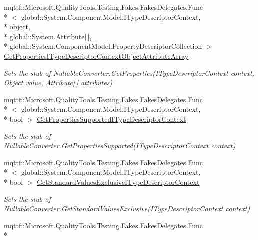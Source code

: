 \begin{DoxyCompactItemize}
mqttf\-::\-Microsoft.\-Quality\-Tools.\-Testing.\-Fakes.\-Fakes\-Delegates.\-Func\\*
$<$ global\-::\-System.\-Component\-Model.\-I\-Type\-Descriptor\-Context, \\*
object, \\*
global\-::\-System.\-Attribute\mbox{[}$\,$\mbox{]}, \\*
global\-::\-System.\-Component\-Model.\-Property\-Descriptor\-Collection $>$ \hyperlink{class_system_1_1_component_model_1_1_fakes_1_1_stub_nullable_converter_a119ee3811381aca5daedfe54266578bd}{Get\-Properties\-I\-Type\-Descriptor\-Context\-Object\-Attribute\-Array}
\begin{DoxyCompactList}\small\item\em Sets the stub of Nullable\-Converter.\-Get\-Properties(\-I\-Type\-Descriptor\-Context context, Object value, Attribute\mbox{[}$\,$\mbox{]} attributes)\end{DoxyCompactList}\item 
mqttf\-::\-Microsoft.\-Quality\-Tools.\-Testing.\-Fakes.\-Fakes\-Delegates.\-Func\\*
$<$ global\-::\-System.\-Component\-Model.\-I\-Type\-Descriptor\-Context, \\*
bool $>$ \hyperlink{class_system_1_1_component_model_1_1_fakes_1_1_stub_nullable_converter_a5f01e07d0064ef551fd367579dabf2e4}{Get\-Properties\-Supported\-I\-Type\-Descriptor\-Context}
\begin{DoxyCompactList}\small\item\em Sets the stub of Nullable\-Converter.\-Get\-Properties\-Supported(\-I\-Type\-Descriptor\-Context context)\end{DoxyCompactList}\item 
mqttf\-::\-Microsoft.\-Quality\-Tools.\-Testing.\-Fakes.\-Fakes\-Delegates.\-Func\\*
$<$ global\-::\-System.\-Component\-Model.\-I\-Type\-Descriptor\-Context, \\*
bool $>$ \hyperlink{class_system_1_1_component_model_1_1_fakes_1_1_stub_nullable_converter_a07495f550b11e246ee86d623c05f13a2}{Get\-Standard\-Values\-Exclusive\-I\-Type\-Descriptor\-Context}
\begin{DoxyCompactList}\small\item\em Sets the stub of Nullable\-Converter.\-Get\-Standard\-Values\-Exclusive(\-I\-Type\-Descriptor\-Context context)\end{DoxyCompactList}\item 
mqttf\-::\-Microsoft.\-Quality\-Tools.\-Testing.\-Fakes.\-Fakes\-Delegates.\-Func\\*

\end{DoxyCompactItemize}
